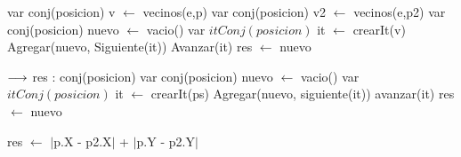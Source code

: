 \begin{algorithm}\phantom{[H]}
\begin{algorithmic}[1]
 
    \State  var conj(posicion) v $\gets$ vecinos(e,p) 
    \State  var conj(posicion) v2 $\gets$ vecinos(e,p2)  
    \State  var conj(posicion) nuevo $\gets$ vacio() 
    \State var $itConj(posicion)$ it $\gets$ crearIt(v) 
     
       
        \State Agregar(nuevo, Siguiente(it))	
       \EndIf
       \State Avanzar(it) 
    \EndWhile
 \State res $\gets$ nuevo     
\EndFunction
\end{algorithmic}
\end{algorithm}

\begin{algorithm}\phantom{[H]}
\begin{algorithmic}[1]
 {$\longrightarrow$ res : conj(posicion)} 
    \State  var conj(posicion) nuevo $\gets$ vacio() 
    \State var $itConj(posicion)$ it $\gets$ crearIt(ps) 
      
       
        \State Agregar(nuevo, siguiente(it))
      \EndIf
      \State avanzar(it) 
    \EndWhile
 \State res $\gets$ nuevo     
\EndFunction
\end{algorithmic}
\end{algorithm}

\begin{algorithm}\phantom{[H]}
\begin{algorithmic}[1]
 
    \State res $\gets$ $\mid$p.X - p2.X$\mid$ + $\mid$p.Y - p2.Y$\mid$     
\EndFunction
\end{algorithmic}
\end{algorithm}

